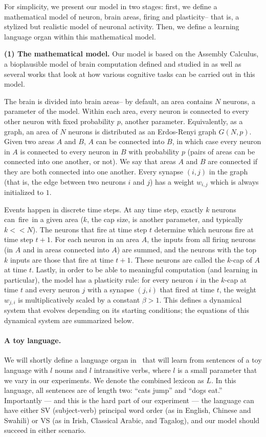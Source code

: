 \documentclass{article}
\begin{document}
For simplicity, we present our model in two stages: first, we define a mathematical model of neuron, brain areas, firing and plasticity-- that is, a stylized but realistic model of neuronal activity. Then, we define a learning language organ within this mathematical model.

\textbf{(1) The mathematical model.} Our model is based on the Assembly Calculus, a bioplausible model of brain computation defined and studied in \cite{Papadimitriou} as well as several works that look at how various cognitive tasks can be carried out in this model. 

The brain is divided into brain areas-- by default, an area contains $N$ neurons, a parameter of the model. Within each area, every neuron is connected to every other neuron with fixed probability $p$, another parameter. Equivalently, as a graph, an area of $N$ neurons is distributed as an Erdos-Renyi graph $G(N,p)$. Given two areas $A$ and $B$, $A$ can be connected into $B$, in which case every neuron in $A$ is connected to every neuron in $B$ with probability $p$ (pairs of areas can be connected into one another, or not). We say that areas $A$ and $B$ are connected if they are both connected into one another. Every synapse $(i,j)$ in the graph (that is, the edge between two neurons $i$ and $j$) has a weight $w_{i,j}$ which is always initialized to $1$.

Events happen in discrete time steps. At any time step, exactly $k$ neurons can fire in a given area ($k$, the cap size, is another parameter, and typically $k << N$). The neurons that fire at time step $t$ determine which neurons fire at time step $t+1$. For each neuron in an area $A$, the inputs from all firing neurons (in $A$ and in areas connected into $A$) are summed, and the neurons with the top $k$ inputs are those that fire at time $t+1$. These neurons are called the $k$-cap of $A$ at time $t$. Lastly, in order to be able to meaningful computation (and learning in particular), the model has a plasticity rule: for every neuron $i$ in the $k$-cap at time $t$ and every neuron $j$ with a synapse $(j,i)$ that fired at time $t$, the weight $w_{j,i}$ is multiplicatively scaled by a constant $\beta > 1$. This defines a dynamical system that evolves depending on its starting conditions; the equations of this dynamical system are summarized below.

\fi

\paragraph{A toy language.} We will shortly define a language organ in \name\ that will learn from sentences of a toy language with $l$ nouns and $l$ intransitive verbs, where $l$ is a small parameter that we vary in our experiments. We denote the combined lexicon as $L$. In this language, all sentences are of length two: ``cats jump'' and ``dogs eat.'' Importantly --- and this is the hard part of our experiment --- the language can have either SV (subject-verb) principal word order (as in English, Chinese and Swahili) or VS (as in Irish, Classical Arabic, and Tagalog), and our model should succeed in either scenario.
\end{document}
